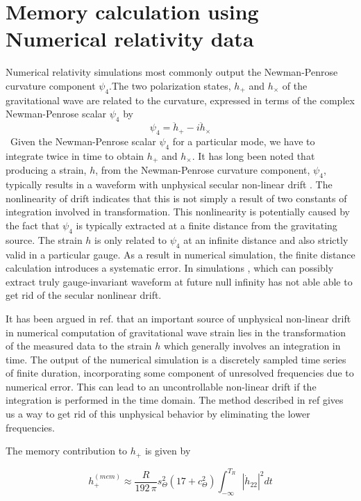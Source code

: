 \documentclass[prd,preprintnumbers,twocolumn,eqsecnum,floatfix,letter]{revtex4}
\begin{document}
\section{Memory calculation using Numerical relativity data}
Numerical relativity simulations most commonly output the Newman-Penrose curvature component $\psi_4$.The two polarization states, $h_{+}$ and $h_{\times}$ of the gravitational wave are related to the curvature, expressed in terms 	of the complex Newman-Penrose scalar $\psi_4$ by 
\begin{equation}
	\psi_4 = \ddot{h}_+ - \mathit{i}\ddot{h}_{\times}
\end{equation}\
Given the Newman-Penrose scalar $\psi_4$ for a particular mode, we have to integrate twice in time to obtain $h_{+}$ and $h_{\times}$. It has long been noted that producing a strain, $h$, from the Newman-Penrose curvature component, $\psi_4$, typically results in a waveform with unphysical secular non-linear drift \cite{Berti2007}. The nonlinearity of drift indicates that this is not simply a result of two constants of integration involved in transformation. This nonlinearity is potentially caused by the fact that $\psi_4$ is typically extracted at a finite distance from the gravitating source. The strain $h$ is only related to $\psi_4$ at an infinite distance and also strictly valid in a particular gauge. As a result in numerical simulation, the finite distance calculation introduces a systematic error. In simulations \cite{Hannam2009, Reisswig2009}, which can possibly extract truly gauge-invariant waveform at future null infinity has not able able to get rid of the secular nonlinear drift.
\par It has been argued in ref. \cite{Reisswig_Pollney2011} that an important source of unphysical non-linear drift in numerical computation of gravitational wave strain lies in the transformation of the measured data to the strain $h$  which generally involves an integration in time. The output of the numerical simulation is a discretely sampled time series of finite duration, incorporating some component of unresolved frequencies due to numerical error. This can lead to an uncontrollable non-linear drift if the integration is performed in the time domain. The method described in ref \cite{Reisswig_Pollney2011} gives us a way to get rid of this unphysical behavior by eliminating the lower frequencies.    
\par The memory contribution to $h_{+}$ is given by \cite{Favata2010}

\begin{equation}\label{eq:3.2}
h_{+}^{(mem)} \approx \frac{R}{192 \, \pi}s_{\Theta}^{2}\left(17 +c_{\Theta}^{2} \right)\int_{-\infty}^{T_R}|\dot{h}_{22}|^2 dt
\end{equation}
\end{document}
